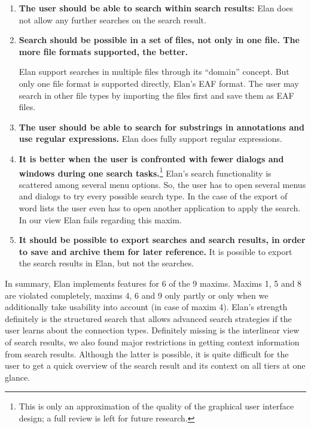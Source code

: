\begin{enumerate}
\item \textbf{The user should be able to search within search results:}
Elan does not allow any further searches on the search result. 

\item \textbf{Search should be possible in a set of files, not only in one file. The more file formats supported, the better.}

Elan support searches in multiple files through its ``domain'' concept. But only one file format is supported directly, Elan's EAF format. The user may search in other file types by importing the files first and save them as EAF files.

\item \textbf{The user should be able to search for substrings in annotations and use regular expressions.}
Elan does fully support regular expressions.
\item \textbf{It is better when the user is confronted with fewer dialogs and windows during one search tasks.}\footnote{This 
 is only an approximation of the quality of the graphical user interface design; a full review is left for future research.}
Elan's search functionality is scattered among several menu options. So, the user has to open several menus and dialogs to try every possible search type. In the case of the export of word lists the user even has to open another application to apply the search. In our view Elan fails regarding this maxim.

\item \textbf{It should be possible to export searches and search results, in order to save and archive them for later reference.} It is possible to export the search results in Elan, but not the searches.
\end{enumerate}

In summary, Elan implements features for 6 of the 9 maxims. Maxims 1, 5 and 8 are violated completely, maxims 4, 6 and 9 only partly or only when we additionally take usability into account (in case of maxim 4). Elan's strength definitely is the structured search that allows advanced search strategies if the user learns about the connection types. Definitely missing is the interlinear view of search results, we also found major restrictions in getting context information from search results. Although the latter is possible, it is quite difficult for the user to get a quick overview of the search result and its context on all tiers at one glance.

